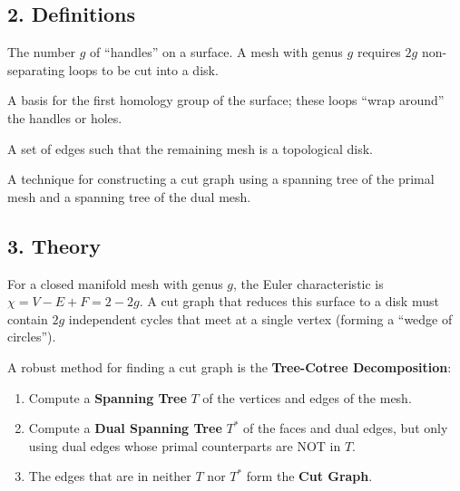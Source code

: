 \subsection{2. Definitions}

\begin{definition}[Genus]\label{def:genus_cut}
The number $g$ of ``handles'' on a surface. A mesh with genus $g$ requires $2g$ non-separating loops to be cut into a disk.
\end{definition}

\begin{definition}\label{def:fundamental_loops}
A basis for the first homology group of the surface; these loops ``wrap around'' the handles or holes.
\end{definition}

\begin{definition}\label{def:cut_graph}
A set of edges such that the remaining mesh is a topological disk.
\end{definition}

\begin{definition}\label{def:tree_cotree}
A technique for constructing a cut graph using a spanning tree of the primal mesh and a spanning tree of the dual mesh.
\end{definition}

\subsection{3. Theory}

For a closed manifold mesh with genus $g$, the Euler characteristic is $\chi = V - E + F = 2 - 2g$. A cut graph that reduces this surface to a disk must contain $2g$ independent cycles that meet at a single vertex (forming a ``wedge of circles'').

A robust method for finding a cut graph is the \textbf{Tree-Cotree Decomposition}:
\begin{enumerate}
    \item Compute a \textbf{Spanning Tree} $T$ of the vertices and edges of the mesh.
    \item Compute a \textbf{Dual Spanning Tree} $T^*$ of the faces and dual edges, but only using dual edges whose primal counterparts are NOT in $T$.
    \item The edges that are in neither $T$ nor $T^*$ form the \textbf{Cut Graph}.
\end{enumerate}

